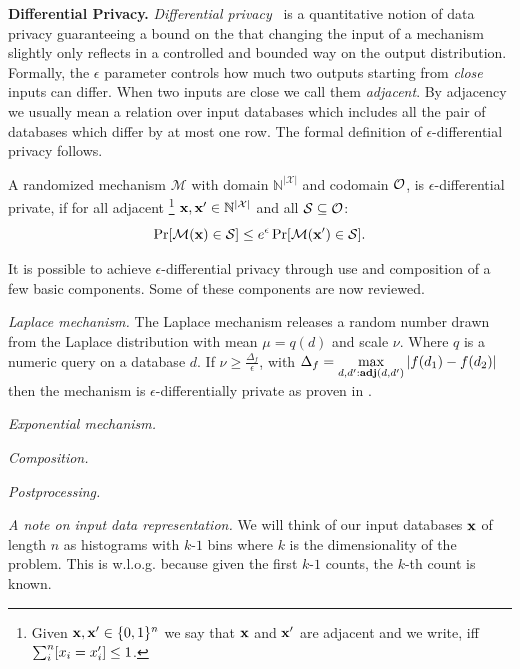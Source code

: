 \documentclass{article}
\begin{document}
\noindent \textbf{Differential Privacy.}
\emph{Differential privacy}~\cite{dwork2006} is a quantitative notion
of data privacy guaranteeing  a bound on the that changing the input of a mechanism slightly only reflects
in a controlled and bounded way on the output distribution. 
Formally, the $\epsilon$ parameter
controls how much two outputs starting from \emph{close} inputs can differ. When two inputs are close we call them \emph{adjacent}.
By adjacency we usually mean a relation over input databases which includes all the pair of databases which differ by at most one row.
The formal definition of $\epsilon$-differential privacy follows.
\begin{definition}
\label{def_epsilon_dp}

A randomized mechanism $\mathcal{M}$ with domain $\mathbb{N}^{|\mathcal{X}|}$ and codomain $\mathcal{O}$, is $\epsilon$-differential private, if for all adjacent
\footnote{Given $\textbf{x}, \textbf{x}'\in\{0,1\}^n$  we say that $\textbf{x}$ and $\textbf{x}'$ are adjacent and we write, iff
$\sum_{i}^{n}[x_i = x'_i ]\leq 1$. } $\textbf{x}, \textbf{x}' \in \mathbb{N}^{|\mathcal{X}|}$ and all $\mathcal{S} \subseteq \mathcal{O}$:
\begin{equation*}
\Pr[\mathcal{M}(\textbf{x}) \in \mathcal{S}] \leq e^\epsilon \Pr[\mathcal{M}(\textbf{x}') \in \mathcal{S}].
\end{equation*}

\end{definition}


It is possible to achieve $\epsilon$-differential privacy through use and composition of
a few basic components. Some of these components are now reviewed.

\noindent \emph{Laplace mechanism.}
The Laplace mechanism releases a random number drawn from the Laplace distribution with
mean $\mu=q(d)$ and scale $\nu$. Where $q$ is a numeric query on a database $d$.
If $\nu\geq \frac{\Delta_f}{\epsilon}$, with $\Delta_f=\displaystyle\max_{d,d':\textbf{adj}(d,d')}{\lvert f(d_1)-f(d_2)\lvert}$
then the mechanism is $\epsilon$-differentially private as proven in \cite{???}.

\noindent \emph{Exponential mechanism.}
 
\noindent \emph{Composition.}

\noindent \emph{Postprocessing.}

\noindent \emph{A note on input data representation.}
We will think of our input databases $\textbf{x}$ of length $n$ as histograms 
with $k$-$1$ bins where $k$ is the dimensionality of the problem.
This is w.l.o.g. because given the first $k$-$1$ counts, the $k$-th count
is known.
\end{document}
